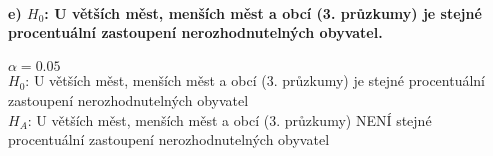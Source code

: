 \documentclass[11pt]{article}
\begin{document}
\hypertarget{e-h_0-u-vux11btux161uxedch-mux11bst-menux161uxedch-mux11bst-a-obcuxed-3.-prux16fzkumy-je-stejnuxe9-procentuuxe1lnuxed-zastoupenuxed-nerozhodnutelnuxfdch-obyvatel.}{%
\paragraph{\texorpdfstring{e) \(H_0\): U větších měst, menších měst a
obcí (3. průzkumy) je stejné procentuální zastoupení nerozhodnutelných
obyvatel.}{e) H\_0: U větších měst, menších měst a obcí (3. průzkumy) je stejné procentuální zastoupení nerozhodnutelných obyvatel.}}\label{e-h_0-u-vux11btux161uxedch-mux11bst-menux161uxedch-mux11bst-a-obcuxed-3.-prux16fzkumy-je-stejnuxe9-procentuuxe1lnuxed-zastoupenuxed-nerozhodnutelnuxfdch-obyvatel.}}

\(\alpha = 0.05\)\\
\(H_0\): U větších měst, menších měst a obcí (3. průzkumy) je stejné
procentuální zastoupení nerozhodnutelných obyvatel\\
\(H_A\): U větších měst, menších měst a obcí (3. průzkumy) NENÍ stejné
procentuální zastoupení nerozhodnutelných obyvatel
\end{document}
